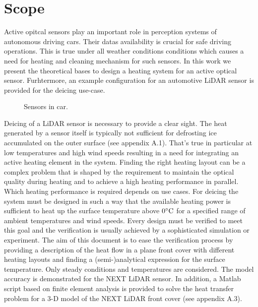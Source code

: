 
\newcommand{\pathPics}{heating_files/Pictures/}

\section{Scope}

Active opitcal sensors play an important role in perception systems of
autonomous driving cars.
Their datas availability is crucial for safe driving operations.
This is true under all weather conditions conditions which causes a need for
heating and cleaning mechanism for such sensors.
In this work we present the theoretical bases to design a heating system for an
active optical sensor.
Furhtermore, an example configuration for an automotive \ac{LiDAR} sensor is
provided for the deicing use-case.

\begin{figure} [H]
  \centering
  \caption{Sensors in car.}
  \label{fig:examples}
\end{figure}


Deicing of a LiDAR sensor is necessary to provide a clear sight.
The heat generated by a sensor itself is typically not sufficient for
defrosting ice accumulated on the outer surface (see appendix A.1).
That's true in particular at low temperatures and high wind speeds resulting in
a need for integrating an active heating element in the system.
Finding the right heating layout can be a complex problem that is shaped by the
requirement to maintain the optical quality during heating and to achieve a
high heating performance in parallel.
Which heating performance is required depends on use cases.
For deicing the system must be designed in such a way that the available
heating power is sufficient to heat up the surface temperature above \(0\dC\)
for a specified range of ambient temperatures and wind speeds.
Every design must be verified to meet this goal and the verification is usually
achieved by a sophisticated simulation or experiment.
The aim of this document is to ease the verification process by providing a
description of the heat flow in a plane front cover with different heating
layouts and finding a (semi-)analytical expression for the surface temperature.
Only steady conditions and temperatures are considered.
The model accuracy is demonstrated for the NEXT LiDAR sensor.
In addition, a Matlab script based on finite element analysis is provided to
solve the heat transfer problem for a 3-D model of the NEXT LiDAR front cover
(see appendix A.3). 

